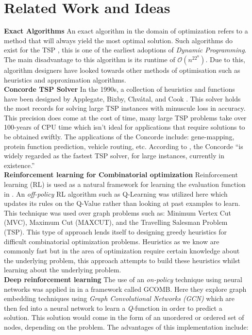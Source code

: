 \documentclass[]{UCD_CS_FYP_Report}
\begin{document}
\chapter{Related Work and Ideas}
\textbf{Exact Algorithms}
An exact algorithm in the domain of optimization refers to a method that will always yield the most optimal solution. Such algorithms do exist for the TSP \cite{Bellman:1962:DPT:321105.321111}, this is one of the earliest adoptions of \textit{Dynamic Programming}. The main disadvantage to this algorithm is its runtime of $\mathcal{O}(n^22^n)$. Due to this, algorithm designers have looked towards other methods of optimisation such as heuristics and approximation algorithms.\\[0.5cm]
\textbf{Concorde TSP Solver}
In the 1990s, a collection of heuristics and functions have been designed by Applegate, Bixby, Chvátal, and Cook \cite{davidapplegate2007}. This solver holds the most records for solving large TSP instances with minuscule loss in accuracy. This precision does come at the cost of time, many large TSP problems take over 100-years of CPU time which isn't ideal for applications that require solutions to be obtained swiftly. The applications of the Concorde include: gene-mapping\cite{10.1093/jhered/esg012}, protein function prediction\cite{Johnson2006}, vehicle routing\cite{ApplegateVPR}, etc. According to \cite{MULDER2003827}, the Concorde “is widely regarded as the fastest TSP solver, for large instances, currently in existence.”\\[0.5cm]
\textbf{Reinforcement learning for Combinatorial optimization}
Reinforcement learning (RL) is used as a natural framework for learning the evaluation function in \cite{DBLP:journals/corr/DaiKZDS17}. An \textit{off-policy} RL algorithm such as Q-Learning was utilized here which updates its rules on the Q-Value rather than looking at past examples to learn. This technique was used over graph problems such as: Minimum Vertex Cut (MVC), Maximum Cut (MAXCUT), and the Travelling Salesman Problem (TSP). This type of approach lends itself to designing greedy heuristics for difficult combinatorial optimization problems. Heuristics as we know are commonly fast but in the area of optimization require certain knowledge about the underlying problem, this approach attempts to build these heuristics whilst learning about the underlying problem.\\[0.5cm]
\textbf{Deep reinforcement learning}
The use of an \textit{on-policy} technique using neural networks was applied in \cite{DeepRL} in a framework called \textsc{GCOMB}. Here they explore graph embedding techniques using \textit{Graph Convolutional Networks (GCN)} which are then fed into a neural network to learn a \textit{Q}-function in order to predict a solution. This solution would come in the form of an unordered or ordered set of nodes, depending on the problem. The advantages of this implementation include: 
\end{document}
